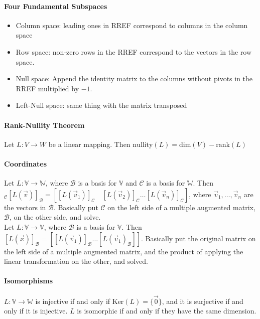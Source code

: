 \documentclass[10pt,letter]{article}
\begin{document}
\paragraph{Four Fundamental Subspaces}
\begin{itemize}
    \item Column space: leading ones in RREF correspond to columns in the column space 
    \item Row space: non-zero rows in the RREF correspond to the vectors in the row space. 
    \item Null space: Append the identity matrix to the columns without pivots in the RREF multiplied by $-1$. 
    \item Left-Null space: same thing with the matrix transposed
\end{itemize}

\paragraph{Rank-Nullity Theorem}
Let $L:V\rightarrow W$ be a linear mapping. Then $\text{nullity}(L)=\text{dim}(V)-\text{rank}(L)$

\paragraph{Coordinates}
Let $L:\mathbb{V}\rightarrow\mathbb{W}$, where $\mathcal{B}$ is a basis for $\mathbb{V}$ and $\mathcal{C}$ is a basis for $\mathbb{W}$. Then $_\mathcal{C}[L(\vec{v})]_\mathcal{B}=[[L(\vec{v}_1)]_\mathcal{C}\quad[L(\vec{v}_2)]_\mathcal{C}\ldots[L(\vec{v}_n)]_\mathcal{C}]$, where $\vec{v}_1,\ldots,\vec{v}_n$ are the vectors in $\mathcal{B}$. Basically put $\mathcal{C}$ on the left side of a multiple augmented matrix, $\mathcal{B}$, on the other side, and solve.\\ 
Let $L:\mathbb{V}\rightarrow\mathbb{V}$, where $\mathcal{B}$ is a basis for $\mathbb{V}$. Then $[L(\vec{x})]_\mathcal{B}=[[L(\vec{v}_1)]_\mathcal{B}\ldots[L(\vec{v}_1)_\mathcal{B}]]$. Basically put the original matrix on the left side of a multiple augmented matrix, and the product of applying the linear transformation on the other, and solved.

\paragraph{Isomorphisms}
$L:\mathbb{V}\rightarrow\mathbb{W}$ is injective if and only if $\text{Ker}(L)=\{\vec{0}\}$, and it is surjective if and only if it is injective. $L$ is isomorphic if and only if they have the same dimension. 
\end{document}
